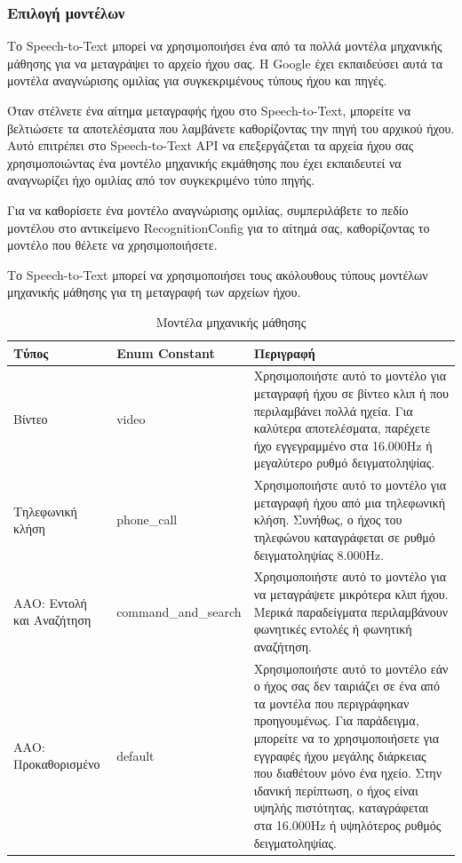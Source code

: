 \documentclass[oneside, 12pt]{book}
\begin{document}
\subsubsection{Επιλογή μοντέλων}
Το Speech-to-Text μπορεί να χρησιμοποιήσει ένα από τα πολλά μοντέλα μηχανικής μάθησης για να μεταγράψει το αρχείο ήχου σας. Η Google έχει εκπαιδεύσει αυτά τα μοντέλα αναγνώρισης ομιλίας για συγκεκριμένους τύπους ήχου και πηγές.

Όταν στέλνετε ένα αίτημα μεταγραφής ήχου στο Speech-to-Text, μπορείτε να βελτιώσετε τα αποτελέσματα που λαμβάνετε καθορίζοντας την πηγή του αρχικού ήχου. Αυτό επιτρέπει στο Speech-to-Text API να επεξεργάζεται τα αρχεία ήχου σας χρησιμοποιώντας ένα μοντέλο μηχανικής εκμάθησης που έχει εκπαιδευτεί να αναγνωρίζει ήχο ομιλίας από τον συγκεκριμένο τύπο πηγής.

Για να καθορίσετε ένα μοντέλο αναγνώρισης ομιλίας, συμπεριλάβετε το πεδίο μοντέλου στο αντικείμενο RecognitionConfig για το αίτημά σας, καθορίζοντας το μοντέλο που θέλετε να χρησιμοποιήσετε.

Το Speech-to-Text μπορεί να χρησιμοποιήσει τους ακόλουθους τύπους μοντέλων μηχανικής μάθησης για τη μεταγραφή των αρχείων ήχου.
\begin{table}[!h]
  \centering
  \caption{Μοντέλα μηχανικής μάθησης}
  \begin{tabularx}{\linewidth}[h]{|p{2cm}|p{4cm}|X|}
    \hline
    Τύπος & Enum Constant & Περιγραφή \\
    \hline
    \hline
    Βίντεο & video & Χρησιμοποιήστε αυτό το μοντέλο για μεταγραφή ήχου σε βίντεο κλιπ ή που περιλαμβάνει πολλά ηχεία. Για καλύτερα αποτελέσματα, παρέχετε ήχο εγγεγραμμένο στα 16.000Hz ή μεγαλύτερο ρυθμό δειγματοληψίας. \\
    \hline
    Τηλεφωνική κλήση & phone\_call & Χρησιμοποιήστε αυτό το μοντέλο για μεταγραφή ήχου από μια τηλεφωνική κλήση. Συνήθως, ο ήχος του τηλεφώνου καταγράφεται σε ρυθμό δειγματοληψίας 8.000Hz. \\
    \hline
    ΑΑΟ: Εντολή και Αναζήτηση & command\_and\_search & Χρησιμοποιήστε αυτό το μοντέλο για να μεταγράψετε μικρότερα κλιπ ήχου. Μερικά παραδείγματα περιλαμβάνουν φωνητικές εντολές ή φωνητική αναζήτηση. \\
    \hline
    ΑΑΟ: Προκαθορισμένο & default & Χρησιμοποιήστε αυτό το μοντέλο εάν ο ήχος σας δεν ταιριάζει σε ένα από τα μοντέλα που περιγράφηκαν προηγουμένως. Για παράδειγμα, μπορείτε να το χρησιμοποιήσετε για εγγραφές ήχου μεγάλης διάρκειας που διαθέτουν μόνο ένα ηχείο. Στην ιδανική περίπτωση, ο ήχος είναι υψηλής πιστότητας, καταγράφεται στα 16.000Hz ή υψηλότερος ρυθμός δειγματοληψίας. \\
    \hline
  \end{tabularx}
\end{table}
\newpage
\end{document}
